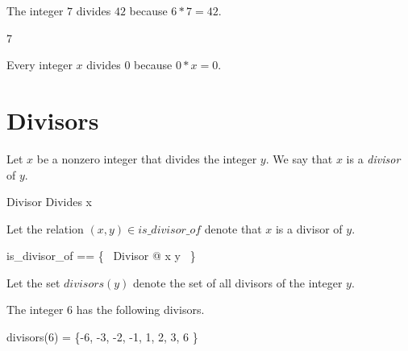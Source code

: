 \documentclass{amsart}
\begin{document}
\begin{example}
The integer $7$ divides $42$ because $6 * 7 = 42$.

\begin{zed}
	7 
\end{zed}
\end{example}

\begin{remark}
Every integer $x$ divides $0$ because $0 * x = 0$.

\end{remark}

\section{Divisors}

Let $x$ be a nonzero integer that divides the integer $y$.
We say that $x$ is a \textit{divisor} of $y$.

\begin{schema}{Divisor}
	Divides
\where
	x 
\end{schema}

Let the relation $(x, y) \in is\_divisor\_of$ denote that $x$ is a divisor of $y$.

\begin{zed}
	is\_divisor\_of == \{~ Divisor @ x \mapsto y ~\}
\end{zed}

Let the set $divisors(y)$ denote the set of all divisors of the integer $y$.


\begin{remark}
\end{remark}

\begin{example}
The integer $6$ has the following divisors.

\begin{zed}
	divisors(6) = \{-6, -3, -2, -1, 1, 2, 3, 6 \}
\end{zed}
\end{example}
\end{document}
